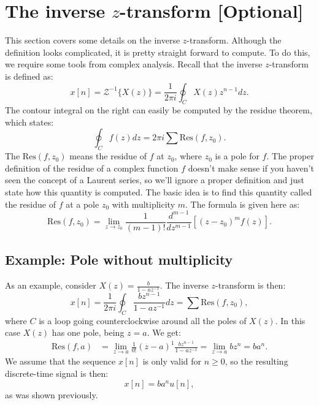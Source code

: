 \section{The inverse $z$-transform [Optional]}
This section covers some details on the inverse $z$-transform.
Although the definition looks complicated, it is pretty straight forward to compute. To do this, we require
some tools from complex analysis. Recall that the inverse $z$-transform is defined as:
\begin{equation}
    x[n]=\mathcal{Z}^{-1}\{X(z)\}=\frac{1}{2\pi i}\oint_C X(z)z^{n-1}dz.
\end{equation}
The contour integral on the right can easily be computed by the residue theorem, which states:
\begin{equation}
    \boxed{\oint_C f(z)dz=2\pi i\sum\text{Res}(f,z_{0}).
    }
    \label{residue_thm}
\end{equation}
The $\text{Res}(f,z_{0})$ means the residue of $f$ at $z_{0}$, where $z_{0}$ is a pole for $f$.
The proper definition of the residue of a complex function $f$ doesn't make sense if you haven't
seen the concept of a Laurent series, so we'll ignore a proper definition and just state
how this quantity is computed. The basic idea is to find this quantity called the residue
of $f$ at a pole $z_{0}$ with multiplicity $m$. The formula is given here as:
\begin{equation}
    \text{Res}(f,z_{0})=\lim_{z\to z_{0}}\frac{1}{(m-1)!}\frac{d^{m-1}}{dz^{m-1}} [(z-z_{0})^{m}f(z)].
    \label{residue}
\end{equation}
\subsection{Example: Pole without multiplicity}
As an example, consider $X(z)=\frac{b}{1-az^{-1}}$. The inverse $z$-transform is then:
\[x[n]=\frac{1}{2\pi i}\oint_{C}\frac{bz^{n-1}}{1-az^{-1}}dz=\sum \text{Res}(f,z_{0}),\]
where $C$ is a loop going counterclockwise around all the poles of $X(z)$. In this case $X(z)$ has one pole, being $z=a$. We get:
\begin{align*}
    \text{Res}(f,a) & =\lim_{z\to a}\frac{1}{0!}(z-a)^{1}\frac{bz^{n-1}}{1-az^{-1}}=\lim_{z\to a}bz^{n}=ba^{n}.
\end{align*}
We assume that the sequence $x[n]$ is only valid for $n\ge 0$, so the resulting discrete-time signal is then:
\begin{equation}
    x[n]=ba^{n}u[n],
\end{equation}
as was shown previously.

